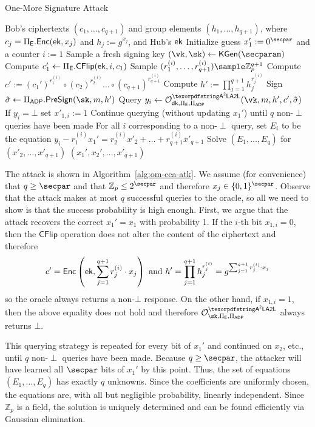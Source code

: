 \begin{algorithm}
\caption{One-More Signature Attack}
\label{alg:om-cca-atk}
\begin{algorithmic}[1]
\small 
\REQUIRE Bob's ciphertexts $(c_1,\ldots,c_{q+1})$ and group elements $(h_1, \dots, h_{q+1})$, where $c_j = \Pi_{\mathsf{E}}.{\mathsf{Enc}}(\mathsf{ek},x_j)$ and $h_j := g^{x_j}$, and Hub's $\mathsf{ek}$
\STATE Initialize guess $x_1' := 0^\secpar$ and a counter $i:=1$
    \STATE Sample a fresh signing key $(\vk, \sk) \gets \kgen(\secparam)$
    \STATE Compute $c_1' \gets\Pi_{\mathsf{E}}.\mathsf{CFlip}(\mathsf{ek}, i, c_1)$
    \STATE Sample $(r_1^{(i)}, \ldots, r_{q+1}^{(i)}) \sample \mathbb{Z}_p^{q+1}$
    \STATE Compute $c' := (c_1')^{r_1^{(i)}} \circ (c_2)^{r_2^{(i)}} \dots \circ (c_{q+1})^{r_{q+1}^{(i)}}$
    \STATE Compute $h' := \prod_{j=1}^{q+1} h_j^{r_j^{(i)}}$
    \STATE Sign $\presig \gets \Pi_\ADP.\presign(\sk, m,h')$
    \STATE Query $y_i \gets \oracle^{\AAL}_{\dk,\Pi_\ENC,\Pi_\ADP}(\vk,m,h',c',\presig)$
    \STATE If $y_i = \bot$ set $x'_{1,i} :=1$
\ENDFOR
\STATE Continue querying (without updating $x_1'$) until $q$ non-$\perp$ queries have been made
\STATE For all $i$ corresponding to a non-$\perp$ query, set $E_i$ to be the equation $y_i - r_1^{(i)} x_1' = r_2^{(i)} x'_2 + \ldots + r_{q+1}^{(i)} x'_{q+1}$
\STATE Solve $(E_1, \dots, E_q)$ for $(x'_2, \dots, x'_{q+1})$
\RETURN $(x_1', x_2', \ldots, x'_{q+1})$
\end{algorithmic}
\end{algorithm}

The attack is shown in Algorithm~\ref{alg:om-cca-atk}. We assume (for convenience) that $q\geq \secpar$ and that $\mathbb{Z}_p \leq 2^\secpar$ and therefore $x_j \in \{0,1\}^\secpar$. Observe that the attack makes at most $q$ successful queries to the oracle, so all we need to show is that the success probability is high enough. First, we argue that the attack recovers the correct $x_1' = x_1$ with probability 1. If the $i$-th bit $x_{1,i} = 0$, then the $\mathsf{CFlip}$ operation does not alter the content of the ciphertext and therefore $$c' = {\mathsf{Enc}}\left(\mathsf{ek}, \sum^{q+1}_{j=1} r_{j}^{(i)} \cdot x_j\right)\text{ and } h' = \prod_{j=1}^{q+1} h_j^{r_j^{(i)}} = g^{\sum^{q+1}_{j=1} r_{j}^{(i)} \cdot x_j}$$
so the oracle always returns a non-$\bot$ response. On the other hand, if $x_{1,i} = 1$, then the above equality does not hold and therefore $\oracle^{\AAL}_{\sk,\Pi_\ENC,\Pi_\ADP}$ always returns $\bot$.

This querying strategy is repeated for every bit of $x_1'$ and continued on $x_2$, etc., until $q$ non-$\perp$ queries have been made. Because $q \geq \secpar$, the attacker will have learned all $\secpar$ bits of $x_1'$ by this point. Thus, the set of equations $(E_1, \dots, E_q)$ has exactly $q$ unknowns. Since the coefficients are uniformly chosen, the equations are, with all but negligible probability, linearly independent. Since $\mathbb{Z}_p$ is a field, the solution is uniquely determined and can be found efficiently via Gaussian elimination.

